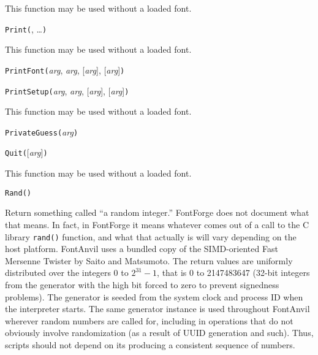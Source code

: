 This function may be used without a loaded font.



\texttt{Print(}, \ldots\texttt{)}

This function may be used without a loaded font.



\texttt{PrintFont(}\textit{arg}, \textit{arg}, [\textit{arg}], [\textit{arg}]\texttt{)}



\texttt{PrintSetup(}\textit{arg}, \textit{arg}, [\textit{arg}], [\textit{arg}]\texttt{)}

This function may be used without a loaded font.



\texttt{PrivateGuess(}\textit{arg}\texttt{)}



\texttt{Quit(}[\textit{arg}]\texttt{)}

This function may be used without a loaded font.



\texttt{Rand()}

Return something called ``a random integer.''  FontForge \FFdiff does not
document what that means.  In fact, in FontForge it means whatever comes out
of a call to the C library \texttt{rand()} function, and what that actually
is will vary depending on the host platform.  FontAnvil uses a bundled copy
of the SIMD-oriented Fast Mersenne Twister by Saito and Matsumoto.  The
return values are uniformly distributed over the integers 0 to $2^{31}-1$,
that is 0 to 2147483647 (32-bit integers from the generator with the high
bit forced to zero to prevent signedness problems).  The generator is seeded
from the system clock and process ID when the interpreter starts.  The same
generator instance is used throughout FontAnvil wherever random numbers are
called for, including in operations that do not obviously involve
randomization (as a result of UUID generation and such).  Thus, scripts
should not depend on its producing a consistent sequence of numbers.

